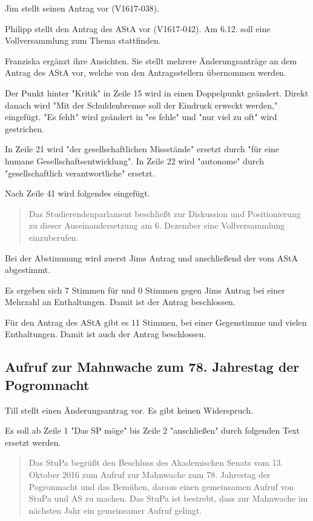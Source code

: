 \documentclass[ngerman,headheight=70pt]{scrartcl}
\begin{document}
    Jim stellt seinen Antrag vor (V1617-038).

    Philipp stellt den Antrag des AStA vor (V1617-042).
    Am 6.12. soll eine Vollversammlung zum Thema stattfinden.

    Franziska ergänzt ihre Ansichten. Sie stellt mehrere Änderungsanträge an dem
    Antrag des AStA vor, welche von den Antragsstellern übernommen werden.

    Der Punkt hinter "Kritik" in Zeile 15 wird in einen Doppelpunkt geändert.
    Direkt danach wird "Mit der Schuldenbremse soll der Eindruck erweckt werden,"
    eingefügt. "Es fehlt" wird geändert in "es fehle" und "nur viel zu oft"
    wird gestrichen.

    In Zeile 21 wird "der gesellschaftlichen Missstände" ersetzt durch "für eine
    humane Gesellschaftsentwicklung". In Zeile 22 wird "autonome" durch
    "gesellschaftlich verantwortliche" ersetzt.

    Nach Zeile 41 wird folgendes eingefügt.

    \blockquote{
        Das Studierendenparlament beschließt zur Diskussion und Positionierung
        zu dieser Auseinandersetzung am 6. Dezember eine Vollversammlung
        einzuberufen.
    }

    Bei der Abstimmung wird zuerst Jims Antrag und anschließend der vom AStA
    abgestimmt.

    Es ergeben sich 7 Stimmen für und 0 Stimmen gegen Jims Antrag bei einer
    Mehrzahl an Enthaltungen. Damit ist der Antrag beschlossen.

    Für den Antrag des AStA gibt es 11 Stimmen, bei einer Gegenstimme und vielen
    Enthaltungen. Damit ist auch der Antrag beschlossen.

    \subsection{Aufruf zur Mahnwache zum 78. Jahrestag der Pogromnacht}

    Till stellt einen Änderungsantrag vor. Es gibt keinen Widerspruch.

    Es soll ab Zeile 1 "Das SP möge" bis Zeile 2 "anschließen" durch folgenden
    Text ersetzt werden.

    \blockquote{
        Das StuPa begrüßt den Beschluss des Akademischen Senats vom 13. Oktober
        2016 zum Aufruf zur Mahnwache zum 78. Jahrestag der Pogromnacht und das
        Bemühen, daraus einen gemeinsamen Aufruf von StuPa und AS zu machen.
        Das StuPa ist bestrebt, dass zur Mahnwache im nächsten Jahr ein gemeinsamer
        Aufruf gelingt.
    }
\end{document}
